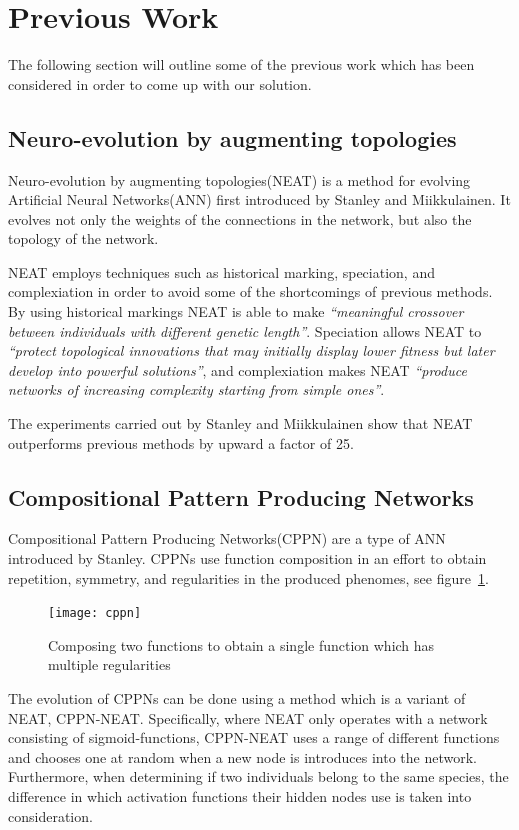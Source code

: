 \section{Previous Work}
The following section will outline some of the previous work which has been considered in order to come up with our solution.

\subsection{Neuro-evolution by augmenting topologies}
Neuro-evolution by augmenting topologies(NEAT) is a method for evolving Artificial Neural Networks(ANN) first introduced by Stanley and Miikkulainen\cite{stanley2002evolving}.
It evolves not only the weights of the connections in the network, but also the topology of the network.

NEAT employs techniques such as historical marking, speciation, and complexiation in order to avoid some of the shortcomings of previous methods.
By using historical markings NEAT is able to make \emph{``meaningful crossover between individuals with different
genetic length''}\cite[p.~50]{Floreano2008}.
Speciation allows NEAT to \emph{``protect topological innovations
that may initially display lower fitness but later
develop into powerful solutions''}\cite[p.~50]{Floreano2008}, and complexiation makes NEAT \emph{``produce networks of increasing complexity
starting from simple ones''}\cite[p.~50]{Floreano2008}.

The experiments carried out by Stanley and Miikkulainen show that NEAT outperforms previous methods by upward a factor of 25\cite[p.~2]{stanley2002evolving}.
\subsection{Compositional Pattern Producing Networks}
\label{sec:cppn}
Compositional Pattern Producing Networks(CPPN) are a type of ANN introduced by Stanley\cite{Stanley2007}.
CPPNs use function composition in an effort to obtain repetition, symmetry, and regularities in the produced phenomes, see figure~\ref{fig:cppn}.
\begin{figure}[ht]
\centering
\texttt{[image: cppn]}
\caption{Composing two functions to obtain a single function which has multiple regularities \cite{Stanley2007}}
\label{fig:cppn}
\end{figure}

The evolution of CPPNs can be done using a method which is a variant of NEAT, CPPN-NEAT.
Specifically, where NEAT only operates with a network consisting of sigmoid-functions, CPPN-NEAT uses a range of different functions and chooses one at random when a new node is introduces into the network.
Furthermore, when determining if two individuals belong to the same species, the difference in which activation functions their hidden nodes use is taken into consideration.

